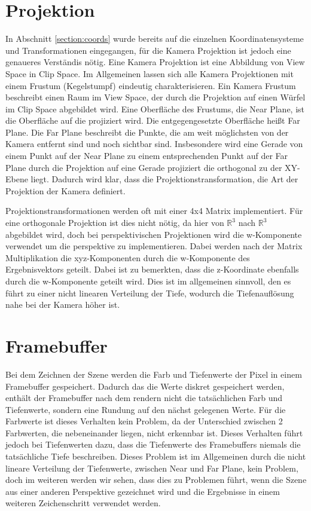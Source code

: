 \section{Projektion}
In Abschnitt \ref{section:coords} wurde bereits auf die einzelnen Koordinatensysteme und Transformationen eingegangen,
für die Kamera Projektion ist jedoch eine genaueres Verständis nötig.
Eine Kamera Projektion ist eine Abbildung von View Space in Clip Space.
Im Allgemeinen lassen sich alle Kamera Projektionen mit einem Frustum (Kegelstumpf) eindeutig charakterisieren.
Ein Kamera Frustum beschreibt einen Raum im View Space, 
der durch die Projektion auf einen Würfel im Clip Space abgebildet wird.
Eine Oberfläche des Frustums, die Near Plane, ist die Oberfläche auf die projiziert wird.
Die entgegengesetzte Oberfläche heißt Far Plane. 
Die Far Plane beschreibt die Punkte, die am weit möglichsten von der Kamera entfernt sind und noch sichtbar sind.
Insbesondere wird eine Gerade von einem Punkt auf der Near Plane zu einem entsprechenden Punkt auf der Far Plane
durch die Projektion auf eine Gerade projiziert die orthogonal zu der XY-Ebene liegt.
Dadurch wird klar, dass die Projektionstransformation, die Art der Projektion der Kamera definiert.
\par
Projektionstransformationen werden oft mit einer 4x4 Matrix implementiert.
Für eine orthogonale Projektion ist dies nicht nötig, da hier von $\mathbb{R}^3$ nach $\mathbb{R}^3$ abgebildet wird,
doch bei perspektivischen Projektionen wird die w-Komponente verwendet um die perspektive zu implementieren.
Dabei werden nach der Matrix Multiplikation die xyz-Komponenten durch die w-Komponente des Ergebnisvektors geteilt.
Dabei ist zu bemerkten, dass die z-Koordinate ebenfalls durch die w-Komponente geteilt wird. 
Dies ist im allgemeinen sinnvoll, den es führt zu einer nicht linearen Verteilung der Tiefe, wodurch die Tiefenauflösung
nahe bei der Kamera höher ist.

\section{Framebuffer}
Bei dem Zeichnen der Szene werden die Farb und Tiefenwerte der Pixel in einem Framebuffer gespeichert.
Dadurch das die Werte diskret gespeichert werden, enthält der Framebuffer nach dem rendern nicht die tatsächlichen Farb und 
Tiefenwerte, sondern eine Rundung auf den nächst gelegenen Werte.
Für die Farbwerte ist dieses Verhalten kein Problem, da der Unterschied zwischen 2 Farbwerten, die nebeneinander liegen, nicht erkennbar ist.
Dieses Verhalten führt jedoch bei Tiefenwerten dazu, dass die Tiefenwerte des Framebuffers niemals die tatsächliche Tiefe beschreiben.
Dieses Problem ist im Allgemeinen durch die nicht lineare Verteilung der Tiefenwerte, zwischen Near und Far Plane, kein Problem, 
doch im weiteren werden wir sehen, dass dies zu Problemen führt, wenn die Szene aus einer anderen Perspektive gezeichnet wird 
und die Ergebnisse in einem weiteren Zeichenschritt verwendet werden.

